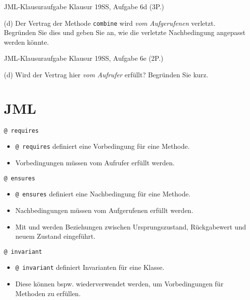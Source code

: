 \documentclass{beamer}
\begin{document}
\begin{frame}{JML-Klausuraufgabe}
    Klausur 19SS, Aufgabe 6d (3P.)

    {
    \footnotesize

    (d) Der Vertrag der Methode \texttt{combine} wird \emph{vom Aufgerufenen} verletzt.
    Begründen Sie dies und geben Sie an, wie die verletzte Nachbedingung angepasst werden könnte.
    }
\end{frame}

\begin{frame}{JML-Klausuraufgabe}
    Klausur 19SS, Aufgabe 6e (2P.)

    {
    \footnotesize

    (d) Wird der Vertrag hier \emph{vom Aufrufer} erfüllt?
    Begründen Sie kurz.
    }
\end{frame}

\section{JML}

\begin{frame}{\texttt{@ requires}}

	\begin{itemize}
		\item \texttt{@ requires} definiert eine Vorbedingung für eine Methode.
		\item Vorbedingungen müssen vom Aufrufer erfüllt werden.
	\end{itemize}
\end{frame}

\begin{frame}{\texttt{@ ensures}}

	\begin{itemize}
		\item \texttt{@ ensures} definiert eine Nachbedingung für eine Methode.
		\item Nachbedingungen müssen vom Aufgerufenen erfüllt werden.
        \item Mit \texttt{\string\old} und \texttt{\string\result} werden Beziehungen zwischen Ursprungszustand, Rückgabewert und neuem Zustand eingeführt.
	\end{itemize}
\end{frame}

\begin{frame}{\texttt{@ invariant}}

	\begin{itemize}
		\item \texttt{@ invariant} definiert Invarianten für eine Klasse.
		\item Diese können bspw. wiederverwendet werden, um Vorbedingungen für Methoden zu erfüllen.
	\end{itemize}
\end{frame}
\end{document}
